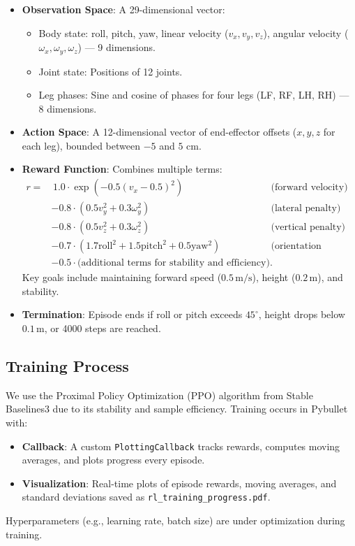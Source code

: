 \documentclass[a4paper,11pt]{article}
\begin{document}
\begin{itemize}
    \item \textbf{Observation Space}: A 29-dimensional vector:
    \begin{itemize}
        \item Body state: roll, pitch, yaw, linear velocity (\(v_x, v_y, v_z\)), angular velocity (\(\omega_x, \omega_y, \omega_z\)) — 9 dimensions.
        \item Joint state: Positions of 12 joints.
        \item Leg phases: Sine and cosine of phases for four legs (LF, RF, LH, RH) — 8 dimensions.
    \end{itemize}
    \item \textbf{Action Space}: A 12-dimensional vector of end-effector offsets (\(x, y, z\) for each leg), bounded between \(-5\) and \(5\) cm.
    \item \textbf{Reward Function}: Combines multiple terms:
    \begin{align*}
			r = & \, 1.0 \cdot \exp(-0.5 (v_x - 0.5)^2) & \text{(forward velocity)} \\
					& - 0.8 \cdot (0.5 v_y^2 + 0.3 \omega_y^2) & \text{(lateral penalty)} \\
					& - 0.8 \cdot (0.5 v_z^2 + 0.3 \omega_z^2) & \text{(vertical penalty)} \\
					& - 0.7 \cdot (1.7 \text{roll}^2 + 1.5 \text{pitch}^2 + 0.5 \text{yaw}^2) & \text{(orientation penalty)} \\
					& - 0.5 \cdot \text{(additional terms for stability and efficiency)}.
    \end{align*}
    Key goals include maintaining forward speed (\(0.5 \, \text{m/s}\)), height (\(0.2 \, \text{m}\)), and stability.
    \item \textbf{Termination}: Episode ends if roll or pitch exceeds \(45^\circ\), height drops below \(0.1 \, \text{m}\), or 4000 steps are reached.
\end{itemize}

\subsection{Training Process}

We use the Proximal Policy Optimization (PPO) algorithm from Stable Baselines3 due to its stability and sample efficiency. Training occurs in Pybullet with:
\begin{itemize}
    \item \textbf{Callback}: A custom \texttt{PlottingCallback} tracks rewards, computes moving averages, and plots progress every episode.
    \item \textbf{Visualization}: Real-time plots of episode rewards, moving averages, and standard deviations saved as \texttt{rl\_training\_progress.pdf}.
\end{itemize}
Hyperparameters (e.g., learning rate, batch size) are under optimization during training.
\end{document}
